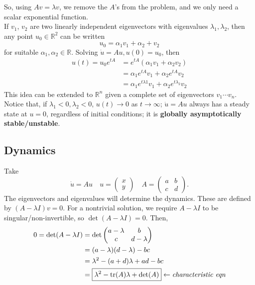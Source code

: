 \documentclass[12pt, oneside]{article}
\begin{document}
So, using $Av = \lambda v$, we remove the $A$'s from the problem, and we only need a scalar exponential function.\\
If $v_1$, $v_2$ are two linearly independent eigenvectors with eigenvalues $\lambda_1, \lambda_2$, then any point $u_0 \in \mathbb{R}^2$ can be written \[u_0 = \alpha_1 v_1 + \alpha_2 + v_2 \] for suitable $\alpha_1,\alpha_2 \in \mathbb{R}$. Solving $\dot{u} = Au, u(0) = u_0$, then \begin{align*}
  u(t) = u_0e^{tA} &= e^{tA}(\alpha_1 v_1 + \alpha_2 v_2)\\
  &= \alpha_1 e^{tA}v_1 + \alpha_2 e^{tA}v_2\\
  &= \alpha_1 e^{t\lambda 1}v_1 + \alpha_2e^{t\lambda_2}v_2
\end{align*}
This idea can be extended to $\mathbb{R}^n$ given a complete set of eigenvectors $v_1 \cdots v_n$.\\
Notice that, if $\lambda_1 < 0, \lambda_2 < 0$, $u(t) \to 0$ as $t \to \infty$; $\dot{u} = Au$ always has a steady state at $u=0$, regardless of initial conditions; it is \textbf{globally asymptotically stable/unstable}.

\subsection{Dynamics}

Take $$\dot{u} = A u\quad u = \begin{pmatrix}
  x\\
  y
\end{pmatrix} \quad A = \begin{pmatrix}
  a & b\\
  c & d
\end{pmatrix}.$$ The eigenvectors and eigenvalues will determine the dynamics. These are defined by $(A-\lambda I)v = 0$. For a nontrivial solution, we require $A - \lambda I$ to be singular/non-invertible, so $\det (A - \lambda I) = 0$. Then, \begin{align*}
  0 = \det (A - \lambda I) &= \det \begin{pmatrix}
    a - \lambda & b \\
    c & d - \lambda
  \end{pmatrix}\\
  &= (a- \lambda)(d-\lambda)-bc\\
  &= \lambda^2 - (a+d)\lambda + ad - bc\\
  &= \boxed{\lambda^2 - \trace (A)\lambda  + \det (A)} \leftarrow \textit{characteristic eqn}
\end{align*}
\end{document}
